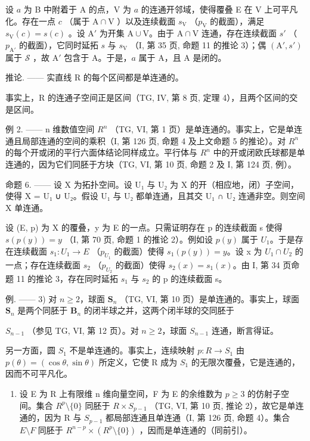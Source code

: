 设 \(a\) 为 B 中附着于 A 的点，V 为 \(a\) 的连通开邻域，使得覆叠 E 在 V 上可平凡化。存在一点 \(c\) （属于 \(\mathrm{A} \cap \mathrm{V}\) ）以及连续截面 \(s_{\mathrm{V}}\) （\(p_{\mathrm{V}}\) 的截面），满足 \(s_{\mathrm{V}}(c) = s(c)\) 。设 \(\mathrm{A}'\) 为开集 \(\mathrm{A} \cup \mathrm{V}\)。由于 \(\mathrm{A} \cap \mathrm{V}\) 连通，存在连续截面 \(s'\) （\(p_{\mathrm{A}'}\) 的截面），它同时延拓 \(s\) 与 \(s_{\mathrm{V}}\) （I, 第 35 页, 命题 11 的推论 3）；偶 \((\mathrm{A}', s')\) 属于 \(\mathcal{S}\) ，故 \(\mathrm{A}'\) 包含于 A。于是，\(a\) 属于 A，且 A 是闭的。

推论. —— 实直线 R 的每个区间都是单连通的。

事实上，R 的连通子空间正是区间（TG, IV, 第 8 页, 定理 4），且两个区间的交是区间。

例 2. —— n 维数值空间 \(R^{n}\) （TG, VI, 第 1 页）是单连通的。事实上，它是单连通且局部连通的空间的乘积（I, 第 126 页, 命题 4 及上文命题 5 的推论）。对 \(R^{n}\) 的每个开或闭的平行六面体结论同样成立。平行体与 \(R^{n}\) 中的开或闭欧氏球都是单连通的，因为它们同胚于方块（TG, VI, 第 10 页, 命题 2 及 I, 第 124 页, 例）。

命题 6. —— 设 X 为拓扑空间。设 U₁ 与 U₂ 为 X 的开（相应地，闭）子空间，使得 X = U₁ ∪ U₂。假设 U₁ 与 U₂ 都单连通，且其交 U₁ ∩ U₂ 连通非空。则空间 X 单连通。

设 (E, p) 为 X 的覆叠，y 为 E 的一点。只需证明存在 p 的连续截面 s 使得 \(s(p(y)) = y\) （I, 第 70 页, 命题 1 的推论 2）。例如设 \(p(y)\) 属于 \(U_{1}\)。于是存在连续截面 \(s_{1}: U_{1} \to E\) （\(p_{U_{1}}\) 的截面）使得 \(s_{1}(p(y)) = y\)。设 x 为 \(U_{1} \cap U_{2}\) 的一点；存在连续截面 \(s_{2}\) （\(p_{U_{2}}\) 的截面）使得 \(s_{2}(x) = s_{1}(x)\)。由 I, 第 34 页命题 11 的推论 3，存在同时延拓 \(s_{1}\) 与 \(s_{2}\) 的 p 的连续截面 s。

例. —— 3) 对 \(n \geqslant 2\)，球面 \(\mathbf{S}_{n}\) （TG, VI, 第 10 页）是单连通的。事实上，球面 \(\mathbf{S}_{n}\) 是两个同胚于 \(\mathbf{B}_{n}\) 的闭半球之并，这两个闭半球的交同胚于

\(S_{n-1}\) （参见 TG, VI, 第 12 页）。对 \(n \geqslant 2\)，球面 \(S_{n-1}\) 连通，断言得证。

另一方面，圆 \(S_{1}\) 不是单连通的。事实上，连续映射 \(p: R \to S_{1}\) 由 \(p(\theta) = (\cos \theta, \sin \theta)\) 所定义，它使 R 成为 \(S_{1}\) 的无限次覆叠，它是连通的，因而不可平凡化。

\begin{enumerate}
\def\labelenumi{\arabic{enumi})}
\setcounter{enumi}{3}
\tightlist
\item
  设 E 为 R 上有限维 n 维向量空间，F 为 E 的余维数为 \(p \geqslant 3\) 的仿射子空间。集合 \(R^{p}\setminus\{0\}\) 同胚于 \(R \times S_{p-1}\) （TG, VI, 第 10 页, 推论 2），故它是单连通的，因为 R 与 \(S_{p-1}\) 都局部连通且单连通（I, 第 126 页, 命题 4）。集合 \(E\setminus F\) 同胚于 \(R^{n-p} \times (R^{p}\setminus\{0\})\) ，因而是单连通的（同前引）。
\end{enumerate}

